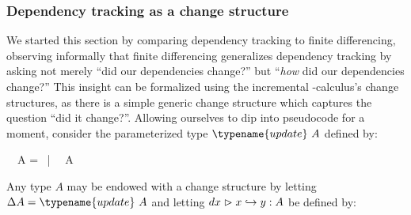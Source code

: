   



\subsubsection{Dependency tracking as a change structure}

We started this section by comparing dependency tracking to finite differencing,
observing informally that finite differencing generalizes dependency tracking by
asking not merely ``did our dependencies change?'' but ``\emph{how} did our
dependencies change?'' This insight can be formalized using the incremental
\fn-calculus's change structures, as there is a simple generic change structure
which captures the question ``did it change?''. Allowing ourselves to dip into
pseudocode for a moment, consider the parameterized type $\typename{update}~A$
defined by:

\begin{code}
  ~~A
  =  ~|~ ~A
\end{code}

\noindent
Any type $A$ may be endowed with a change structure by letting $\Delta A = \typename{update}~A$ and letting $\gvalid{A}{dx} x y$ be defined by:
%
\begin{mathpar}

\end{mathpar}

